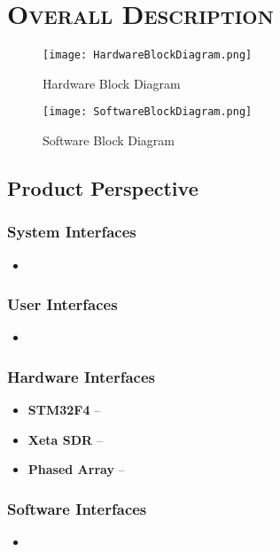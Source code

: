 \documentclass[ProjectRequirements.tex]{subfiles}
\begin{document}
\bigskip

\section{\textsc{\Large Overall Description}}
	\begin{figure}[H]
		\centering
		\texttt{[image: HardwareBlockDiagram.png]}
		\caption{Hardware Block Diagram \label{fig:HardwareBlockDiagram}}
		\clearpage
		\texttt{[image: SoftwareBlockDiagram.png]}
		\caption{Software Block Diagram \label{fig:SoftwareBlockDiagram}}
	\end{figure}
	\subsection{Product Perspective}
	
		\subsubsection{System Interfaces}
			\begin{itemize}\itemsep1pt
				\item 
			\end{itemize}	
			
		\subsubsection{User Interfaces}
			\begin{itemize}\itemsep1pt
				\item 
			\end{itemize}
			
		\subsubsection{Hardware Interfaces}
			\begin{itemize}\itemsep1pt
				\item \textbf{STM32F4} -- 
				\item \textbf{Xeta SDR} -- 
				\item \textbf{Phased Array} -- 
			\end{itemize}
			
		\subsubsection{Software Interfaces}
			\begin{itemize}\itemsep1pt
				\item 
			\end{itemize}
			
\end{document}
